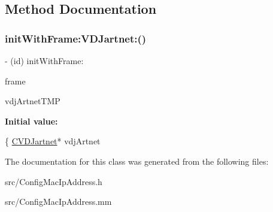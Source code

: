 \subsection{Method Documentation}
\mbox{\label{interfaceConfigIpAddress_aca31bc2897a8952983169dca717fff29}} 
\subsubsection{\texorpdfstring{init\+With\+Frame\+:\+V\+D\+Jartnet\+:()}{initWithFrame:VDJartnet:()}}
{\footnotesize\ttfamily -\/ (id) init\+With\+Frame\+: \begin{DoxyParamCaption}\item[{(C\+G\+Rect)}]{frame }\item[{VDJartnet:(\hyperlink{classCVDJartnet}{C\+V\+D\+Jartnet}$\ast$)}]{vdj\+Artnet\+T\+MP }\end{DoxyParamCaption}}

{\bfseries Initial value\+:}
\begin{DoxyCode}
\{
    \hyperlink{classCVDJartnet}{CVDJartnet}* vdjArtnet
\end{DoxyCode}


The documentation for this class was generated from the following files\+:\begin{DoxyCompactItemize}
\item 
src/Config\+Mac\+Ip\+Address.\+h\item 
src/Config\+Mac\+Ip\+Address.\+mm\end{DoxyCompactItemize}
